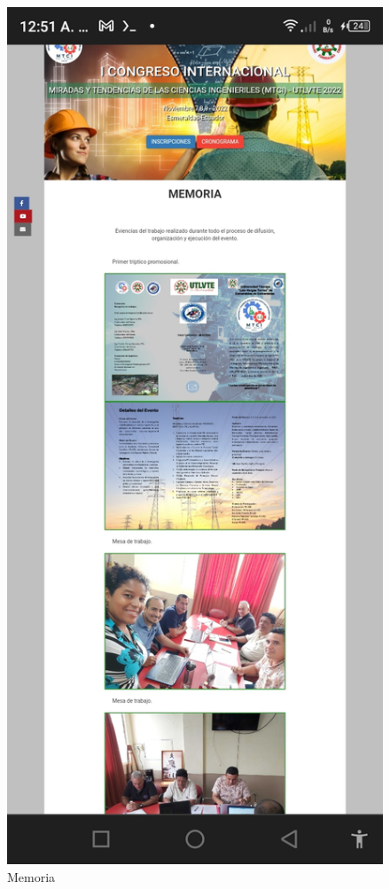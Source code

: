 \documentclass[a4paper,14px]{article}
\begin{document}
\begin{figure}[H]
  \centering
  \includegraphics[scale=0.3]{memoria.jpg}
  \caption{Memoria}
  \label{fig:arquitectura}
\end{figure}
\end{document}
